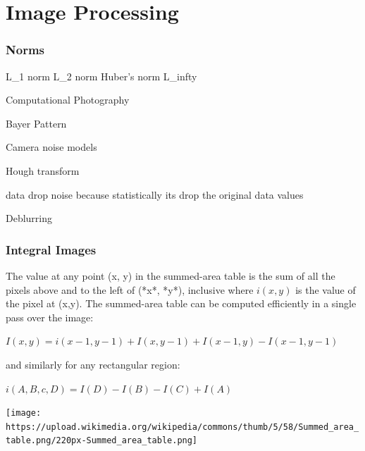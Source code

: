 \chapter{Image Processing}


\subsection[]{Norms}
L_1 norm
L_2 norm
Huber’s norm
L_infty 

Computational Photography

Bayer Pattern

Camera noise models

Hough transform

 data drop noise because statistically its drop the original data values

Deblurring


\subsection{Integral Images}


The value at any point (x, y) in the summed-area table is the sum of all the pixels above and to the left of (*x*, *y*), inclusive where $i(x,y)$  is the value of the pixel at (x,y). The summed-area table can be computed efficiently in a single pass over the image:

$I(x,y) = i(x-1,y-1) + I(x,y-1) + I(x-1,y)-I(x-1,y-1)$

and similarly for any rectangular region:

$ i(A,B,c,D) = I(D) - I(B) - I(C)+I(A)$

\texttt{[image: https://upload.wikimedia.org/wikipedia/commons/thumb/5/58/Summed\_area\_table.png/220px-Summed\_area\_table.png]}

